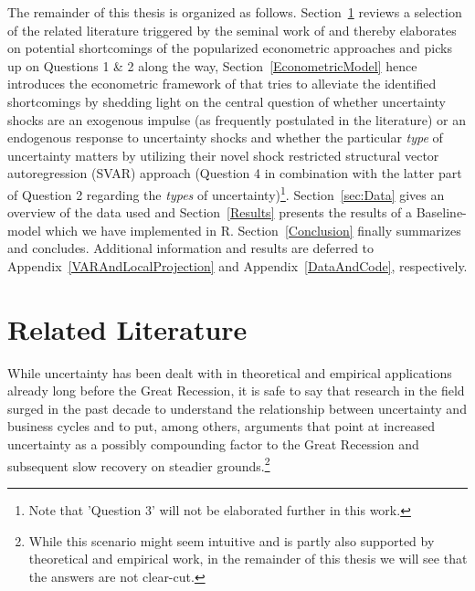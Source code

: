 \documentclass[a4paper,11pt,listof=nochaptergap,oneside,pointednumbers,bibtotoc,bigheadings,liststotoc,hidelinks]{scrbook}
\theoremstyle{mysatz}
\theoremstyle{mydefinition}
\theoremstyle{mytheorem}
\theoremstyle{mybemerkung}
\begin{document}
The remainder of this thesis is organized as follows. Section~\ref{UncertaintyandBusinessCyclesRelatedLiterature} reviews a selection of the related literature triggered by the seminal work of \citet{bloom:09} and thereby elaborates on potential shortcomings of the popularized econometric approaches and picks up on Questions 1 \& 2 along the way, Section~\ref{EconometricModel} hence introduces the econometric framework of \citet{ludvigsonetal:19} that tries to alleviate the identified shortcomings by shedding light on the central question of whether uncertainty shocks are an exogenous impulse (as frequently postulated in the literature) or an endogenous response to uncertainty shocks and whether the particular \textit{type} of uncertainty matters by utilizing their novel shock restricted structural vector autoregression (SVAR) approach (Question 4 in combination with the latter part of Question 2 regarding the \textit{types} of uncertainty)\footnote{Note that 'Question 3' will not be elaborated further in this work.}. Section~\ref{sec:Data} gives an overview of the data used and Section~\ref{Results} presents the results of a Baseline-model which we have implemented in R. Section~\ref{Conclusion} finally summarizes and concludes. Additional information and results are deferred to Appendix~\ref{VARAndLocalProjection} and Appendix~\ref{DataAndCode}, respectively.



\chapter{Related Literature}
\label{UncertaintyandBusinessCyclesRelatedLiterature}

While uncertainty has been dealt with in theoretical and empirical applications already long before the Great Recession, it is safe to say that research in the field surged in the past decade to understand the relationship between uncertainty and business cycles and to put, among others, arguments that point at increased uncertainty as a possibly compounding factor to the Great Recession and subsequent slow recovery on steadier grounds.\footnote{While this scenario might seem intuitive and is partly also supported by theoretical and empirical work, in the remainder of this thesis we will see that the answers are not clear-cut.} 
\end{document}
